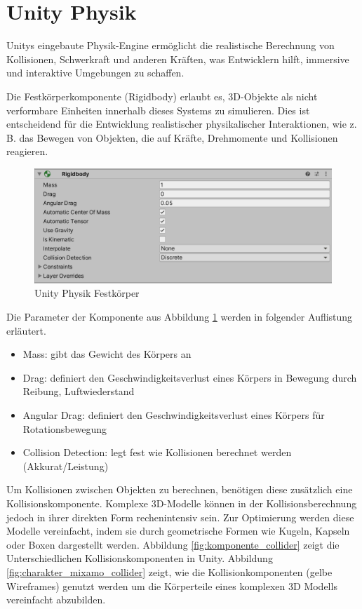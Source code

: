 \section{Unity Physik}
\label{sec:physik}
Unitys eingebaute Physik-Engine ermöglicht die realistische Berechnung von Kollisionen, Schwerkraft und anderen Kräften, was Entwicklern hilft, immersive und interaktive Umgebungen zu schaffen.

Die Festkörperkomponente (Rigidbody) erlaubt es, 3D-Objekte als nicht verformbare Einheiten innerhalb dieses Systems zu simulieren. Dies ist entscheidend für die Entwicklung realistischer physikalischer Interaktionen, wie z. B. das Bewegen von Objekten, die auf Kräfte, Drehmomente und Kollisionen reagieren.

\begin{figure}[H]
  \centering  
  \includegraphics[scale=0.5]{img/komponente_rigidbody}
  \caption{Unity Physik Festkörper}
  \label{fig:komponente_rigidbody}
\end{figure}

Die Parameter der Komponente aus Abbildung \ref{fig:komponente_rigidbody} werden in folgender Auflistung erläutert.

\begin{itemize}
  \item Mass: gibt das Gewicht des Körpers an
  \item Drag: definiert den Geschwindigkeitsverlust eines Körpers in Bewegung durch Reibung, Luftwiederstand
  \item Angular Drag: definiert den Geschwindigkeitsverlust eines Körpers für Rotationsbewegung
  \item Collision Detection: legt fest wie Kollisionen berechnet werden (Akkurat/Leistung)
 \end{itemize}
 
Um Kollisionen zwischen Objekten zu berechnen, benötigen diese zusätzlich eine Kollisionskomponente. Komplexe 3D-Modelle können in der Kollisionsberechnung jedoch in ihrer direkten Form rechenintensiv sein. Zur Optimierung werden diese Modelle vereinfacht, indem sie durch geometrische Formen wie Kugeln, Kapseln oder Boxen dargestellt werden. Abbildung \ref{fig:komponente_collider} zeigt die Unterschiedlichen Kollisionskomponenten in Unity. Abbildung \ref{fig:charakter_mixamo_collider} zeigt, wie die Kollisionkomponenten (gelbe Wireframes) genutzt werden um die Körperteile eines komplexen 3D Modells vereinfacht abzubilden.

